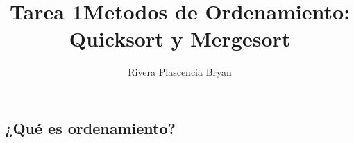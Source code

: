 \documentclass[12pt]{article}
\title{Tarea 1}
\author{Rivera Plascencia Bryan}
\begin{document}
\maketitle

\begin{abstract}

\end{abstract}

\newpage

\title{Metodos de Ordenamiento: \textbf{Quicksort} y \textbf{Mergesort}}

\subsection{¿Qué es ordenamiento?}
\end{document}
